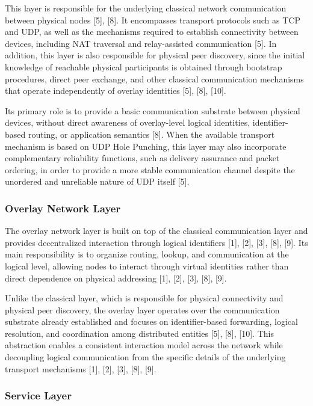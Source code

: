 \documentclass[12pt,a4paper]{article}
\begin{document}
This layer is responsible for the underlying classical network communication between
physical nodes [5], [8]. It encompasses transport protocols such as TCP and UDP, as
well as the mechanisms required to establish connectivity between devices, including
NAT traversal and relay-assisted communication [5]. In addition, this layer is also
responsible for physical peer discovery, since the initial knowledge of reachable
physical participants is obtained through bootstrap procedures, direct peer exchange,
and other classical communication mechanisms that operate independently of overlay
identities [5], [8], [10].

Its primary role is to provide a basic communication substrate between physical
devices, without direct awareness of overlay-level logical identities, identifier-based
routing, or application semantics [8]. When the available transport mechanism is based
on UDP Hole Punching, this layer may also incorporate complementary reliability
functions, such as delivery assurance and packet ordering, in order to provide a more
stable communication channel despite the unordered and unreliable nature of UDP
itself [5].

\subsubsection{Overlay Network Layer}

The overlay network layer is built on top of the classical communication layer and
provides decentralized interaction through logical identifiers [1], [2], [3], [8], [9]. Its main
responsibility is to organize routing, lookup, and communication at the logical level,
allowing nodes to interact through virtual identities rather than direct dependence on
physical addressing [1], [2], [3], [8], [9].

Unlike the classical layer, which is responsible for physical connectivity and physical
peer discovery, the overlay layer operates over the communication substrate already
established and focuses on identifier-based forwarding, logical resolution, and
coordination among distributed entities [5], [8], [10]. This abstraction enables a consistent
interaction model across the network while decoupling logical communication from
the specific details of the underlying transport mechanisms [1], [2], [3], [8], [9].

\subsubsection{Service Layer}
\end{document}
